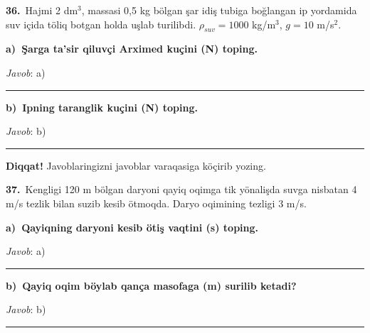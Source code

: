 \documentclass[11pt,a4paper]{article}
\newcommand{\blank}{\rule{5cm}{0.4pt}}
\begin{document}
\noindent{}\par\vspace{14pt}
\noindent\textbf{36.}\ Hajmi 2 dm$^3$, massasi 0,5 kg bölgan şar idiş tubiga boğlangan ip yordamida suv içida töliq botgan holda uşlab turilibdi. $\rho_{suv}=1000$ kg/m$^3$, $g=10$ m/s$^2$.\par\smallskip
\medskip\noindent\textbf{a)\ Şarga ta’sir qiluvçi Arximed kuçini (N) toping.}\par
\noindent\textit{Javob}: a)\ \blank\par
\medskip\noindent\textbf{b)\ Ipning taranglik kuçini (N) toping.}\par
\noindent\textit{Javob}: b)\ \blank\par
\medskip\noindent\textbf{Diqqat!} Javoblaringizni javoblar varaqasiga köçirib yozing.\par\vspace{10pt}
\noindent\textbf{37.}\ Kengligi 120 m bölgan daryoni qayiq oqimga tik yönalişda suvga nisbatan 4 m/s tezlik bilan suzib kesib ötmoqda. Daryo oqimining tezligi 3 m/s.\par\smallskip
\medskip\noindent\textbf{a)\ Qayiqning daryoni kesib ötiş vaqtini (s) toping.}\par
\noindent\textit{Javob}: a)\ \blank\par
\medskip\noindent\textbf{b)\ Qayiq oqim böylab qança masofaga (m) surilib ketadi?}\par
\noindent\textit{Javob}: b)\ \blank\par
\end{document}
